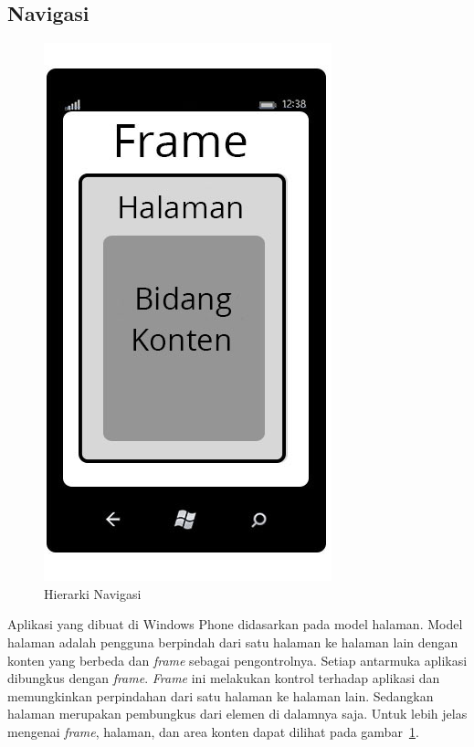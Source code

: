 
\subsection{Navigasi \cite{MSDN}}
\label{subsubsec:Navigasi}
\begin{figure}[h]
	\centering
		\includegraphics[scale=0.4]{Gambar/nav_hierarchy}
	\caption{Hierarki Navigasi}
	\label{fig:nav_hierarchy}
\end{figure}
\newpage
\hspace{0.5cm} Aplikasi yang dibuat di Windows Phone didasarkan pada model halaman. Model halaman adalah pengguna berpindah dari satu halaman ke halaman lain dengan konten yang berbeda dan \textit{frame} sebagai pengontrolnya. Setiap antarmuka aplikasi dibungkus dengan \textit{frame}. \textit{Frame} ini melakukan kontrol terhadap aplikasi dan memungkinkan perpindahan dari satu halaman ke halaman lain. Sedangkan halaman merupakan pembungkus dari elemen di dalamnya saja. Untuk lebih jelas mengenai \textit{frame}, halaman, dan area konten dapat dilihat pada gambar~\ref{fig:nav_hierarchy}.

